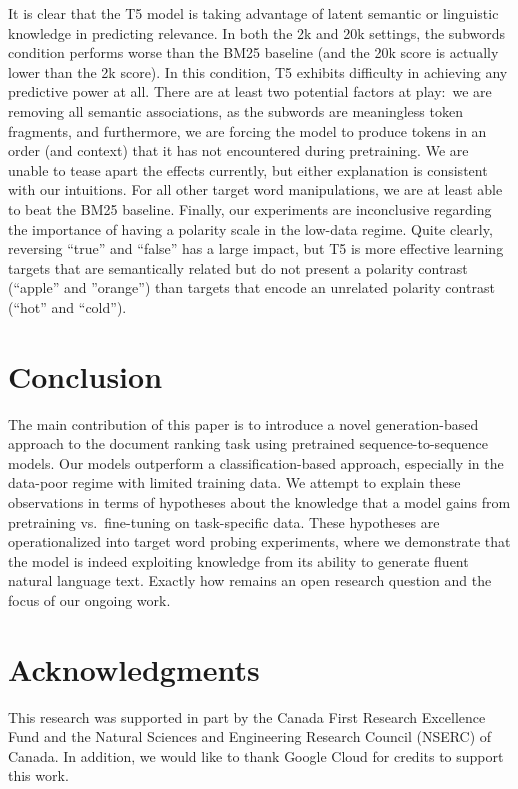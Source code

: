 \documentclass{article}
\begin{document}
It is clear that the T5 model is taking advantage of latent semantic or linguistic knowledge in predicting relevance.
In both the 2k and 20k settings, the subwords condition performs worse than the BM25 baseline (and the 20k score is actually lower than the 2k score).
In this condition, T5 exhibits difficulty in achieving any predictive power at all.
There are at least two potential factors at play:\ we are removing all semantic associations, as the subwords are meaningless token fragments, and furthermore, we are forcing the model to produce tokens in an order (and context) that it has not encountered during pretraining.
We are unable to tease apart the effects currently, but either explanation is consistent with our intuitions.
For all other target word manipulations, we are at least able to beat the BM25 baseline.
Finally, our experiments are inconclusive regarding the importance of having a polarity scale in the low-data regime.
Quite clearly, reversing ``true'' and ``false'' has a large impact, but T5 is more effective learning targets that are semantically related but do not present a polarity contrast (``apple'' and ''orange'') than targets that encode an unrelated polarity contrast (``hot'' and ``cold'').

\section{Conclusion}

The main contribution of this paper is to introduce a novel generation-based approach to the document ranking task using pretrained sequence-to-sequence models.
Our models outperform a classification-based approach, especially in the data-poor regime with limited training data.
We attempt to explain these observations in terms of hypotheses about the knowledge that a model gains from pretraining vs.\ fine-tuning on task-specific data.
These hypotheses are operationalized into target word probing experiments, where we demonstrate that the model is indeed exploiting knowledge from its ability to generate fluent natural language text.
Exactly how remains an open research question and the focus of our ongoing work.

\section{Acknowledgments}

This research was supported in part by the Canada First Research Excellence Fund and the Natural Sciences and Engineering Research Council (NSERC) of Canada.
In addition, we would like to thank Google Cloud for credits to support this work.



\end{document}
